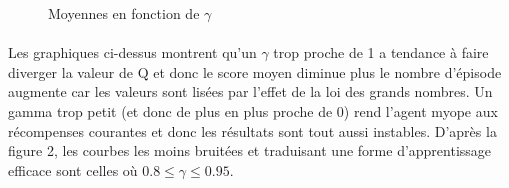 \documentclass[12pt,oneside,a4paper]{article}
\begin{document}
\begin{figure}[hbt!]
{        }
        \hspace{0mm}
        \caption{Moyennes en fonction de $\gamma$}
    \end{figure}

    \paragraph{}
    Les graphiques ci-dessus montrent qu'un $\gamma$ trop proche de 1 a tendance à faire diverger la
    valeur de $\mathrm{Q}$ et donc le score moyen diminue plus le nombre d'épisode augmente car les valeurs sont lisées
    par l'effet de la loi des grands nombres. Un gamma trop petit (et donc de plus en plus proche de 0)
    rend l'agent myope aux récompenses courantes et donc les résultats sont tout aussi instables. D'après la figure 2,
    les courbes les moins bruitées et traduisant une forme d'apprentissage efficace sont celles où
    $0.8 \leq \gamma \leq 0.95$.
    \newpage
\end{document}
